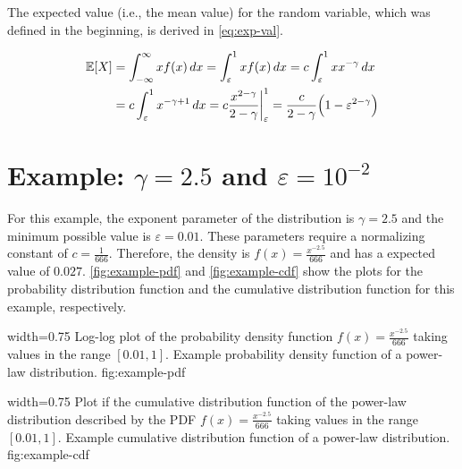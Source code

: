 The expected value (i.e., the mean value) for the random variable, which was defined in the beginning, is derived in \autoref{eq:exp-val}.


\begin{align}
	\mathbb{E}[{X}] & = \int_{-\infty}^{\infty} x f(x) \, dx = \int_{\varepsilon}^{1} x f(x) \, dx = c \int_{\varepsilon}^{1} x x^{-\gamma} \, dx \\
	    & = c \int_{\varepsilon}^{1} x^{-\gamma+1} \, dx = c \frac{x^{2-\gamma}}{2-\gamma}  \bigg |_{\varepsilon}^{1} = \frac{c}{2-\gamma} \Big(1 - \varepsilon^{2-\gamma}\Big)
\label{eq:exp-val}
\end{align}



\section{Example: \(\gamma = 2.5\) and \(\varepsilon = 10^{-2}\)}
\label{sec:example}

For this example, the exponent parameter of the distribution is \(\gamma = 2.5\) and the minimum possible value is \(\varepsilon = 0.01\).
These parameters require a normalizing constant of \(c = \frac{1}{666}\).
Therefore, the density is \(f(x) = \frac{x^{-2.5}}{666}\) and has a expected value of \(0.027\).
\autoref{fig:example-pdf} and \autoref{fig:example-cdf} show the plots for the probability distribution function and the cumulative distribution function for this example, respectively.

      {width=0.75\textwidth}
      {Log-log plot of the probability density function \(f(x) = \frac{x^{-2.5}}{666}\) taking values in the range \([0.01, 1]\).}
      {Example probability density function of a power-law distribution.}
      {fig:example-pdf}

      {width=0.75\textwidth}
      {Plot if the cumulative distribution function of the power-law distribution described by the PDF \(f(x) = \frac{x^{-2.5}}{666}\) taking values in the range \([0.01, 1]\).}
      {Example cumulative distribution function of a power-law distribution.}
      {fig:example-cdf}




